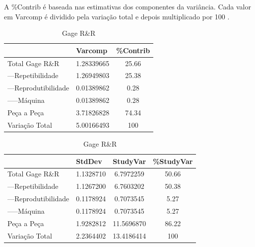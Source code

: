 \documentclass[
12pt,					%
openright,				%
oneside,				%
a4paper,				%
english,
brazil
]{ABNT/abntex2_report}
\begin{document}
A \%Contrib  é baseada nas estimativas dos componentes da variância. Cada valor em Varcomp é dividido pela variação total e depois multiplicado por 100 \cite{estudos_rr}.  

\begin{table}[H]
	\caption{Gage R\&R}
	\centering
	\begin{tabular}{lcc}
										   & \multicolumn{1}{l}{Varcomp} & \multicolumn{1}{l}{\%Contrib} \\ \hline
	\multicolumn{1}{l|}{Total Gage R\&R}   & 1.28339665                  & 25.66                         \\
	\multicolumn{1}{l|}{---Repetibilidade}    & 1.26949803                  & 25.38                         \\
	\multicolumn{1}{l|}{---Reprodutibilidade} & 0.01389862                  & 0.28                          \\
	\multicolumn{1}{l|}{-----Máquina}           & 0.01389862                  & 0.28                          \\
	\multicolumn{1}{l|}{Peça a Peça}      & 3.71826828                  & 74.34                         \\
	\multicolumn{1}{l|}{Variação Total}    & 5.00166493                  & 100                          
	\end{tabular}
	\label{tab:gagerr}
\end{table}

\begin{table}[H]
	\caption{Gage R\&R}
	\centering
	\begin{tabular}{lccc}
										   & \multicolumn{1}{l}{StdDev} & \multicolumn{1}{l}{StudyVar} & \multicolumn{1}{l}{\%StudyVar} \\ \hline
	\multicolumn{1}{l|}{Total Gage R\&R}   & 1.1328710                  & 6.7972259                    & 50.66                          \\
	\multicolumn{1}{l|}{---Repetibilidade}    & 1.1267200                  & 6.7603202                    & 50.38                          \\
	\multicolumn{1}{l|}{---Reprodutibilidade} & 0.1178924                  & 0.7073545                    & 5.27                           \\
	\multicolumn{1}{l|}{-----Máquina}           & 0.1178924                  & 0.7073545                    & 5.27                           \\
	\multicolumn{1}{l|}{Peça a Peça}       & 1.9282812                  & 11.5696870                   & 86.22                          \\
	\multicolumn{1}{l|}{Variação Total}    & 2.2364402                  & 13.4186414                   & 100                           
	\end{tabular}
	\end{table}
\end{document}
